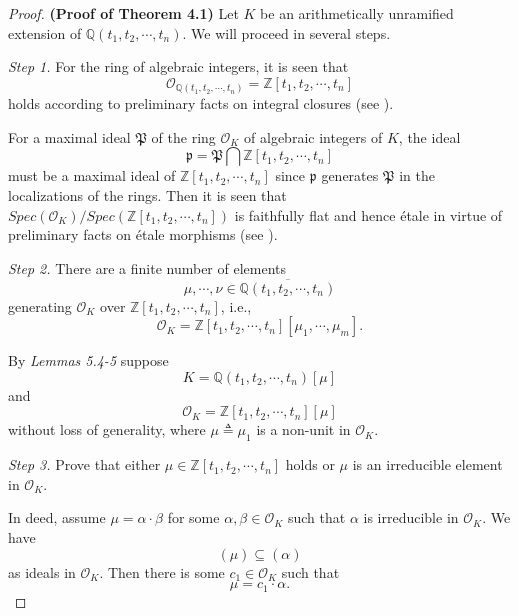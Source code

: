 \documentclass{amsart}
\theoremstyle{definition}
\numberwithin{equation}{section}
\begin{document}
\begin{proof}
\textbf{(Proof of Theorem 4.1)} Let $K$ be an arithmetically unramified extension of $\mathbb{Q}(t_{1},t_{2},\cdots,t_{n})$. We will proceed in several steps.

\emph{Step 1.} For the ring of algebraic integers, it is seen that
\begin{equation*}
\mathcal{O}_{\mathbb{Q}(t_{1},t_{2},\cdots,t_{n})}=\mathbb{Z}[t_{1},t_{2},\cdots,t_{n}]
\end{equation*}
holds  according to preliminary facts on
integral closures (see \cite{bourbaki}).

For a maximal ideal $\mathfrak{P}$ of the ring $\mathcal{O}_{K}$ of
algebraic integers of $K$, the ideal
\begin{equation*}
\mathfrak{p}=\mathfrak{P}\bigcap \mathbb{Z}[t_{1},t_{2},\cdots,t_{n}]
\end{equation*}
must be a maximal ideal of $\mathbb{Z}[t_{1},t_{2},\cdots,t_{n}]$ since $\mathfrak{p}$ generates
$\mathfrak{P}$ in the localizations of the rings. Then it is seen that $Spec(\mathcal{O}_{K})/Spec(\mathbb{Z}[t_{1},t_{2},\cdots,t_{n}])$ is faithfully flat and hence \'{e}tale in
virtue of preliminary facts on \'{e}tale morphisms (see \cite{sga1,mln}).

\emph{Step 2.} There are a finite number of elements
\begin{equation*}
\mu,\cdots,\nu\in \overline{\mathbb{Q}(t_{1},t_{2},\cdots,t_{n})}
\end{equation*}
generating $\mathcal{O}_{K}$ over $\mathbb{Z}[t_{1},t_{2},\cdots,t_{n}]$, i.e.,
\begin{equation*}
\mathcal{O}_{K}=\mathbb{Z}[t_{1},t_{2},\cdots,t_{n}][\mu_{1},\cdots,\mu_{m}].
\end{equation*}

By \emph{Lemmas 5.4-5} suppose
$$
K=\mathbb{Q}(t_{1},t_{2},\cdots,t_{n})[\mu]
$$ and
$$\mathcal{O}_{K}=\mathbb{Z}[t_{1},t_{2},\cdots,t_{n}][\mu]$$
without loss of generality, where $\mu\triangleq \mu_{1}$ is a non-unit in $\mathcal{O}_{K}$.

\emph{Step 3.} Prove that either $\mu\in \mathbb{Z}[t_{1},t_{2},\cdots,t_{n}]$ holds or $\mu$ is an irreducible element in $\mathcal{O}_{K}$.

In deed, assume $\mu=\alpha \cdot\beta$ for some $\alpha,\beta\in \mathcal{O}_{K}$ such that $\alpha$ is irreducible in $\mathcal{O}_{K}$. We have $$(\mu)\subseteq (\alpha)$$ as ideals in $\mathcal{O}_{K}$. Then there is some $c_{1}\in \mathcal{O}_{K}$ such that $$\mu=c_{1}\cdot \alpha.$$


\end{proof}
\end{document}
